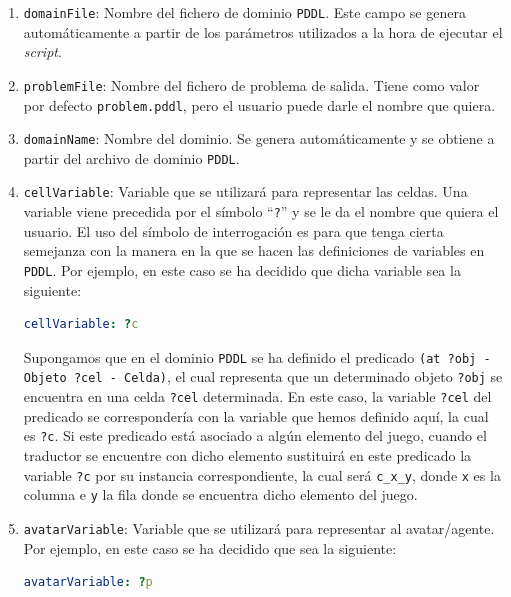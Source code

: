 \begin{enumerate}
    \item \texttt{domainFile}: Nombre del fichero de dominio \texttt{PDDL}. Este campo se genera
    automáticamente a partir de los parámetros utilizados a la hora de ejecutar el \textit{script}.
    
    \item \texttt{problemFile}: Nombre del fichero de problema de salida. Tiene como valor por defecto
    \texttt{problem.pddl}, pero el usuario puede darle el nombre que quiera.
    
    \item \texttt{domainName}: Nombre del dominio. Se genera automáticamente y se obtiene a partir del
    archivo de dominio \texttt{PDDL}.
    
    \item  \label{enum:cell} \texttt{cellVariable}: Variable que se utilizará para representar las celdas. Una
    variable viene precedida por el símbolo ``\texttt{?}'' y se le da el nombre que quiera el usuario. El uso del
    símbolo de interrogación es para que tenga cierta semejanza con la manera en la que se hacen las definiciones
    de variables en \texttt{PDDL}. Por ejemplo, en este caso se ha decidido que dicha variable sea la
    siguiente:
    
    \begin{lstlisting}[language=yaml]
cellVariable: ?c
    \end{lstlisting}
    
    Supongamos que en el dominio \texttt{PDDL} se ha definido el predicado \texttt{(at ?obj - Objeto ?cel - Celda)},
    el cual representa que un determinado objeto \texttt{?obj} se encuentra en una celda \texttt{?cel} determinada.
    En este caso, la variable \texttt{?cel} del predicado se correspondería con la variable que hemos
    definido aquí, la cual es \texttt{?c}. Si este predicado está asociado a algún elemento del juego,
    cuando el traductor se encuentre con dicho elemento sustituirá en este predicado la variable
    \texttt{?c} por su instancia correspondiente, la cual será \texttt{c\_x\_y}, donde \texttt{x}
    es la columna e \texttt{y} la fila donde se encuentra dicho elemento del juego.
    
    \item \texttt{avatarVariable}: Variable que se utilizará para representar al avatar/agente. Por
    ejemplo, en este caso se ha decidido que sea la siguiente:
    
    \begin{lstlisting}[language=yaml]
avatarVariable: ?p
    \end{lstlisting}
    

\end{enumerate}
